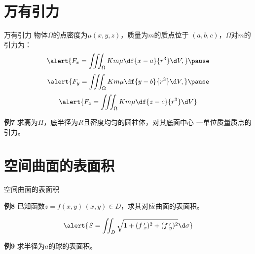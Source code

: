 \section{万有引力}

\begin{frame}{万有引力}
	\linespread{1.2}
	物体$\Omega$的点密度为$\mu(x,y,z)$，质量为$m$的质点位于
	$(a,b,c)$，$\Omega$对$m$的引力为：\pause
	$$\alert{F_x=\iiint_{\Omega}Km\mu\df{x-a}{r^3}\d V,}\pause $$
	$$\alert{F_y=\iiint_{\Omega}Km\mu\df{y-b}{r^3}\d V,}\pause $$
	$$\alert{F_z=\iiint_{\Omega}Km\mu\df{z-c}{r^3}\d V} $$
\end{frame}

\begin{frame}
	\linespread{1.2}
	\begin{exampleblock}{{\bf 例7}\hfill}
		求高为$H$，底半径为$R$且密度均匀的圆柱体，对其底面中心
		一单位质量质点的引力。
	\end{exampleblock}\pause
	\begin{center}
	\end{center}
\end{frame}

\section{空间曲面的表面积}

\begin{frame}{空间曲面的表面积}
	\linespread{1.2}\pause
	\begin{exampleblock}{{\bf 例8}\hfill}
		已知函数$z=f(x,y)\,(x,y)\in D$，求其对应曲面的表面积。
	\end{exampleblock}
	\pause
	$$\alert{S=\iint_D\sqrt{1+(f\,'_x)^2+(f\,'_y)^2}\d\sigma}$$
	\pause
	\begin{exampleblock}{{\bf 例9}\hfill}
		求半径为$a$的球的表面积。
	\end{exampleblock}
\end{frame}

